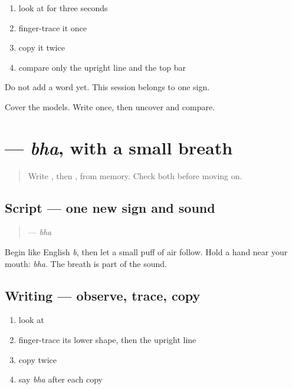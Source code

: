 \begin{enumerate}
\raggedright
  \item look at \textbf{} for three seconds
  \item finger-trace it once
  \item copy it twice
  \item compare only the upright line and the top bar
\end{enumerate}

Do not add a word yet. This session belongs to one sign.

\begin{tcolorbox}[breakable,colback=teal!4,colframe=teal!35!black,title={Before you move on}]
Cover the models. Write \textbf{} once, then uncover and compare.
\end{tcolorbox}
\section[\texorpdfstring{\mw{भ} (bha)}{भ (bha)}]{ — \emph{bha}, with a small breath}

\label{lesson:MW-W02-bha}



\begin{quote}
Write \textbf{}, then \textbf{}, from memory. Check both before moving on.
\end{quote}

\subsection*{Script — one new sign and sound}
\begin{quote}
\textbf{} — \emph{bha}
\end{quote}

Begin like English \emph{b}, then let a small puff of air follow. Hold a hand near your mouth: \emph{bha}. The breath is part of the sound.

\subsection*{Writing — observe, trace, copy}

\begin{enumerate}
\raggedright
  \item look at \textbf{}
  \item finger-trace its lower shape, then the upright line
  \item copy \textbf{} twice
  \item say \emph{bha} after each copy
\end{enumerate}

